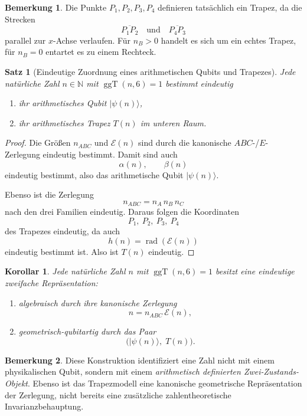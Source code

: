 \documentclass[11pt,a4paper]{article}
\newtheorem{satz}{Satz}
\newtheorem{korollar}{Korollar}
\theoremstyle{definition}
\newtheorem{bemerkung}{Bemerkung}
\DeclareMathOperator{\ggT}{ggT}
\DeclareMathOperator{\rad}{rad}
\begin{document}
 	\begin{bemerkung}
 		Die Punkte $P_1,P_2,P_3,P_4$ definieren tatsächlich ein Trapez, da die Strecken
 		\[
 		\overline{P_1P_2}
 		\quad\text{und}\quad
 		\overline{P_4P_3}
 		\]
 		parallel zur $x$-Achse verlaufen. Für $n_B>0$ handelt es sich um ein echtes Trapez, für $n_B=0$ entartet es zu einem Rechteck.
 	\end{bemerkung}
 	
 	\begin{satz}[Eindeutige Zuordnung eines arithmetischen Qubits und Trapezes]
 		Jede natürliche Zahl $n\in\mathbb{N}$ mit $\ggT(n,6)=1$ bestimmt eindeutig
 		\begin{enumerate}
 			\item ihr arithmetisches Qubit $|\psi(n)\rangle$,
 			\item ihr arithmetisches Trapez $T(n)$ im unteren Raum.
 		\end{enumerate}
 	\end{satz}
 	
 	\begin{proof}
 		Die Größen $n_{ABC}$ und $\mathcal E(n)$ sind durch die kanonische $ABC$-/$E$-Zerlegung eindeutig bestimmt. Damit sind auch
 		\[
 		\alpha(n),\qquad \beta(n)
 		\]
 		eindeutig bestimmt, also das arithmetische Qubit $|\psi(n)\rangle$.
 		
 		Ebenso ist die Zerlegung
 		\[
 		n_{ABC}=n_A\,n_B\,n_C
 		\]
 		nach den drei Familien eindeutig. Daraus folgen die Koordinaten
 		\[
 		P_1,\ P_2,\ P_3,\ P_4
 		\]
 		des Trapezes eindeutig, da auch
 		\[
 		h(n)=\rad(\mathcal E(n))
 		\]
 		eindeutig bestimmt ist. Also ist $T(n)$ eindeutig.
 	\end{proof}
 	
 	\begin{korollar}
 		Jede natürliche Zahl $n$ mit $\ggT(n,6)=1$ besitzt eine eindeutige zweifache Repräsentation:
 		\begin{enumerate}
 			\item algebraisch durch ihre kanonische Zerlegung
 			\[
 			n=n_{ABC}\,\mathcal E(n),
 			\]
 			\item geometrisch-qubitartig durch das Paar
 			\[
 			\bigl(|\psi(n)\rangle,\;T(n)\bigr).
 			\]
 		\end{enumerate}
 	\end{korollar}
 	
 	\begin{bemerkung}
 		Diese Konstruktion identifiziert eine Zahl nicht mit einem physikalischen Qubit, sondern mit
 		einem \emph{arithmetisch definierten Zwei-Zustands-Objekt}. Ebenso ist das Trapezmodell eine
 		kanonische geometrische Repräsentation der Zerlegung, nicht bereits eine zusätzliche
 		zahlentheoretische Invarianzbehauptung.
 	\end{bemerkung}
 	
\end{document}
